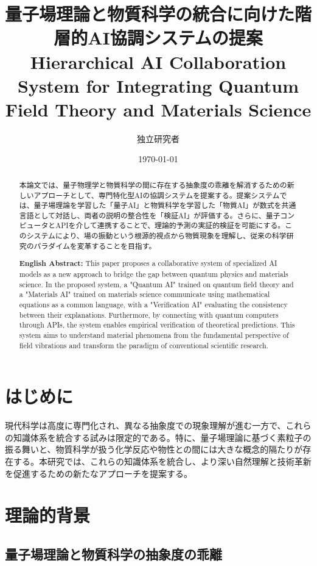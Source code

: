 \documentclass[12pt,a4paper]{article}
\title{量子場理論と物質科学の統合に向けた階層的AI協調システムの提案\\
\large{Hierarchical AI Collaboration System for Integrating Quantum Field Theory and Materials Science}}
\author{独立研究者}
\date{\today}
\begin{document}
\maketitle

\begin{abstract}
本論文では、量子物理学と物質科学の間に存在する抽象度の乖離を解消するための新しいアプローチとして、専門特化型AIの協調システムを提案する。提案システムでは、量子場理論を学習した「量子AI」と物質科学を学習した「物質AI」が数式を共通言語として対話し、両者の説明の整合性を「検証AI」が評価する。さらに、量子コンピュータとAPIを介して連携することで、理論的予測の実証的検証を可能にする。このシステムにより、場の振動という根源的視点から物質現象を理解し、従来の科学研究のパラダイムを変革することを目指す。
\end{abstract}

\begin{abstract}
\textbf{English Abstract:} This paper proposes a collaborative system of specialized AI models as a new approach to bridge the gap between quantum physics and materials science. In the proposed system, a "Quantum AI" trained on quantum field theory and a "Materials AI" trained on materials science communicate using mathematical equations as a common language, with a "Verification AI" evaluating the consistency between their explanations. Furthermore, by connecting with quantum computers through APIs, the system enables empirical verification of theoretical predictions. This system aims to understand material phenomena from the fundamental perspective of field vibrations and transform the paradigm of conventional scientific research.
\end{abstract}

\section{はじめに}

現代科学は高度に専門化され、異なる抽象度での現象理解が進む一方で、これらの知識体系を統合する試みは限定的である。特に、量子場理論に基づく素粒子の振る舞いと、物質科学が扱う化学反応や物性との間には大きな概念的隔たりが存在する。本研究では、これらの知識体系を統合し、より深い自然理解と技術革新を促進するための新たなアプローチを提案する。

\section{理論的背景}

\subsection{量子場理論と物質科学の抽象度の乖離}
\end{document}
